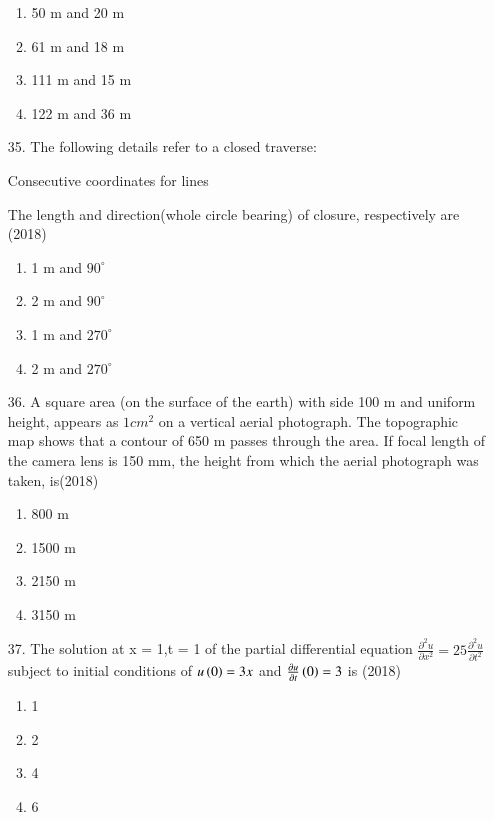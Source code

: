 \documentclass[journal]{IEEEtran}
\begin{document}
\begin{enumerate}
\begin{enumerate}[label=(\Alph*)]
        \item 50 m and 20 m 
        \item 61 m and 18 m 
        \item 111 m and 15 m 
        \item 122 m and 36 m  
    \end{enumerate}
    \item[35.]The following details refer to a closed traverse:
    \begin{table}[h!]
        \centering
        
        \caption{Consecutive coordinates for lines}
    \end{table}
    The length and direction(whole circle bearing) of closure, respectively are \hfill (2018)
    \begin{enumerate}[label=(\Alph*)]
        \item 1 m and $90^{\circ}$
        \item 2 m and $90^{\circ}$
        \item 1 m and $270^{\circ}$
        \item 2 m and $270^{\circ}$
    \end{enumerate}
    \item[36.] A square area (on the surface of the earth) with side 100 m and uniform height, appears as
    $1 cm^2$ on a vertical aerial photograph. The topographic map shows that a contour of 650 m
    passes through the area. If focal length of the camera lens is 150 mm, the height from
    which the aerial photograph was taken, is\hfill (2018)
    \begin{enumerate}[label=(\Alph*)]
        \item 800 m 
        \item 1500 m 
        \item 2150 m 
        \item 3150 m 
    \end{enumerate}
    \item[37.]The solution at x = 1,t = 1 of the partial differential equation $\frac{\partial ^2 u}{\partial x^2} = 25\frac{\partial^2u}{\partial t^2}$ subject to initial conditions of $u\left(0\right) = 3x$ and $\frac{\partial u}{\partial t}\left(0\right)=3$ is \hfill (2018)
    \begin{enumerate}[label=(\Alph*)]
        \item 1
        \item 2
        \item 4
        \item 6
    \end{enumerate}

\end{enumerate}
\end{document}
